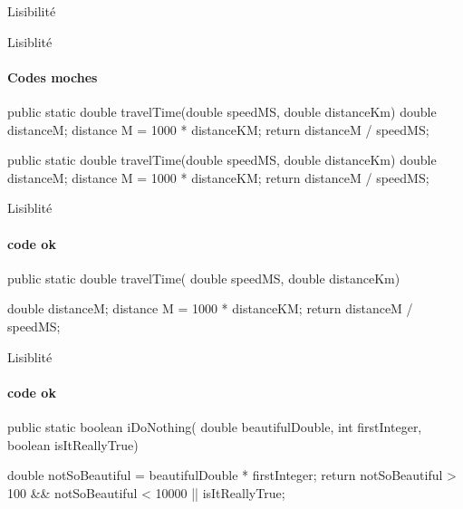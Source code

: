 \begin{hideedit}
\begin{frame}{Lisibilité}
\end{frame}

\begin{frame}[fragile]{Lisiblité}
  \framesubtitle{Codes moches}
  \begin{java}
public static double travelTime(double speedMS, double distanceKm) {
double distanceM;
distance M = 1000 * distanceKM;
return distanceM / speedMS;
}
\end{java}

\begin{java}
public static double travelTime(double speedMS, double distanceKm) {
  double distanceM;
    distance M = 1000 * distanceKM; return distanceM / speedMS; }
  \end{java}
\end{frame}

\begin{frame}[fragile]{Lisiblité}
  \framesubtitle{code ok}
  \begin{java}
public static double travelTime(
    double speedMS, double distanceKm) {

  double distanceM;
  distance M = 1000 * distanceKM;
  return distanceM / speedMS;
}
  \end{java}
\end{frame}
\begin{frame}[fragile]{Lisiblité}
  \framesubtitle{code ok}
  \begin{java}
public static boolean iDoNothing(
    double beautifulDouble, int firstInteger,
    boolean isItReallyTrue) {

  double notSoBeautiful = beautifulDouble * firstInteger;
  return notSoBeautiful > 100 && notSoBeautiful < 10000
      || isItReallyTrue;
}
  \end{java}
\end{frame}


\end{hideedit}
